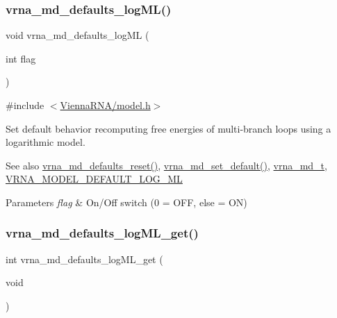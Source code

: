 \subsubsection{\texorpdfstring{vrna\_md\_defaults\_logML()}{vrna\_md\_defaults\_logML()}}
{\footnotesize\ttfamily void vrna\+\_\+md\+\_\+defaults\+\_\+log\+ML (\begin{DoxyParamCaption}\item[{int}]{flag }\end{DoxyParamCaption})}



{\ttfamily \#include $<$\mbox{\hyperlink{model_8h}{Vienna\+R\+N\+A/model.\+h}}$>$}



Set default behavior recomputing free energies of multi-\/branch loops using a logarithmic model. 

\begin{DoxySeeAlso}{See also}
\mbox{\hyperlink{group__model__details_ga70834424cf804d149937de89f80ceb45}{vrna\+\_\+md\+\_\+defaults\+\_\+reset()}}, \mbox{\hyperlink{group__model__details_ga8ac6ff84936282436f822644bf841f66}{vrna\+\_\+md\+\_\+set\+\_\+default()}}, \mbox{\hyperlink{group__model__details_ga1f8a10e12a0a1915f2a4eff0b28ea17c}{vrna\+\_\+md\+\_\+t}}, \mbox{\hyperlink{group__model__details_ga938f68463e84fe060aa6502f428a517d}{V\+R\+N\+A\+\_\+\+M\+O\+D\+E\+L\+\_\+\+D\+E\+F\+A\+U\+L\+T\+\_\+\+L\+O\+G\+\_\+\+ML}} 
\end{DoxySeeAlso}

\begin{DoxyParams}{Parameters}
{\em flag} & On/\+Off switch (0 = O\+FF, else = ON) \\
\hline
\end{DoxyParams}
\mbox{\label{group__model__details_ga93f04e070d529c5d0bb87c9681f6ad29}} 
\subsubsection{\texorpdfstring{vrna\_md\_defaults\_logML\_get()}{vrna\_md\_defaults\_logML\_get()}}
{\footnotesize\ttfamily int vrna\+\_\+md\+\_\+defaults\+\_\+log\+M\+L\+\_\+get (\begin{DoxyParamCaption}\item[{void}]{ }\end{DoxyParamCaption})}



